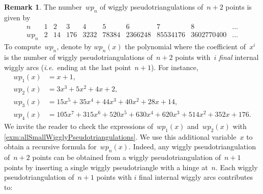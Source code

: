 \documentclass{amsart}
\theoremstyle{definition}
\newtheorem{remark}[theorem]{Remark}
\newcommand{\ie}{\textit{i.e.}~} %
\newcommand{\darkblue}{\color{darkblue}} %
\newcommand{\defn}[1]{\textsl{\darkblue #1}} %
\begin{document}
\begin{remark}
\label{rem:numberWigglyPseudotriangulations}
The number~$wp_n$ of wiggly pseudotriangulations of~$n+2$ points is given by
\[
\begin{array}{c|ccccccccc}
n & 1 & 2 & 3 & 4 & 5 & 6 & 7 & 8 & \dots \\
\hline
wp_n & 2 & 14 & 176 & 3232 & 78384 & 2366248 & 85534176 & 3602770400 & \dots
\end{array}
\]
To compute~$wp_n$, denote by $wp_n(x)$ the polynomial where the coefficient of~$x^i$ is the number of wiggly pseudotriangulations of~$n+2$ points with~$i$ \defn{final} internal wiggly arcs (\ie ending at the last point~$n+1$).
For instance,
\begin{align*}
	wp_1(x) & = x + 1, \\
	wp_2(x) & = 3 x^3 + 5 x^2 + 4 x + 2, \\
	wp_3(x) & = 15 x^5 + 35 x^4 + 44 x^3 + 40 x^2 + 28 x + 14, \\
	wp_4(x) & = 105 x^7 + 315 x^6 + 520 x^5 + 630 x^4 + 620 x^3 + 514 x^2 + 352 x + 176.
\end{align*}
We invite the reader to check the expressions of~$wp_1(x)$ and~$wp_2(x)$ with \cref{exm:allSmallWigglyPseudotriangulations}.
We use this additional variable~$x$ to obtain a recursive formula for~$wp_n(x)$.
Indeed, any wiggly pseudotriangulation of~$n+2$ points can be obtained from a wiggly pseudotriangulation of~$n+1$ points by inserting a single wiggly pseudotriangle with a hinge at~$n$.
Each wiggly pseudotriangulation of~$n+1$ points with $i$ final internal wiggly arcs contributes to:
\begin{itemize}

\end{itemize}
\end{remark}
\end{document}
